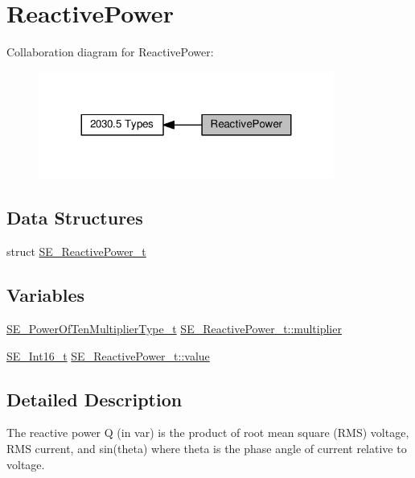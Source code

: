 \hypertarget{group__ReactivePower}{}\section{Reactive\+Power}
\label{group__ReactivePower}
Collaboration diagram for Reactive\+Power\+:\nopagebreak
\begin{figure}[H]
\begin{center}
\leavevmode
\includegraphics[width=275pt]{group__ReactivePower}
\end{center}
\end{figure}
\subsection*{Data Structures}
\begin{DoxyCompactItemize}
\item 
struct \hyperlink{structSE__ReactivePower__t}{S\+E\+\_\+\+Reactive\+Power\+\_\+t}
\end{DoxyCompactItemize}
\subsection*{Variables}
\begin{DoxyCompactItemize}
\item 
\hyperlink{group__PowerOfTenMultiplierType_gaf0317b781dc8dbb9cb6ac4e44a14fdef}{S\+E\+\_\+\+Power\+Of\+Ten\+Multiplier\+Type\+\_\+t} \hyperlink{group__ReactivePower_ga98dc0843c7fc3a2685dfee658053c5a8}{S\+E\+\_\+\+Reactive\+Power\+\_\+t\+::multiplier}
\item 
\hyperlink{group__Int16_ga0d600c7df811a7d4b4816e8965877690}{S\+E\+\_\+\+Int16\+\_\+t} \hyperlink{group__ReactivePower_ga560149c35f951e26080f1c5445e5e344}{S\+E\+\_\+\+Reactive\+Power\+\_\+t\+::value}
\end{DoxyCompactItemize}


\subsection{Detailed Description}
The reactive power Q (in var) is the product of root mean square (R\+MS) voltage, R\+MS current, and sin(theta) where theta is the phase angle of current relative to voltage. 

